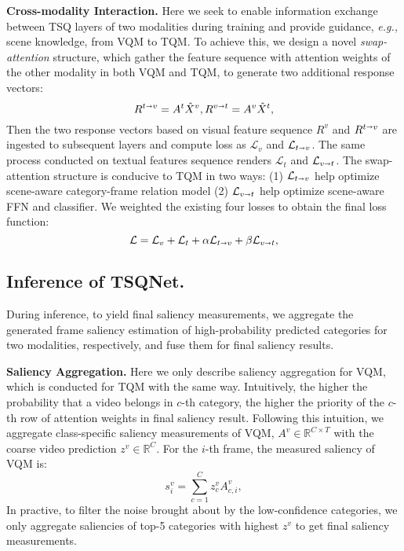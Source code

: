 \documentclass[runningheads]{llncs}
\begin{document}
\noindent\textbf{Cross-modality Interaction.}
Here we seek to enable information exchange between TSQ layers of two modalities during training and provide guidance, \emph{e.g.,} scene knowledge, from VQM to TQM. To achieve this, we design a novel \textit{swap-attention} structure, which gather the feature sequence with attention weights of the other modality in both VQM and TQM, to generate two additional response vectors: 
\begin{equation}
R^{t\shortrightarrow v}=A^t \hat{X}^v, R^{v\shortrightarrow t} = A^v \hat{X}^t ,   
\end{equation}
Then the two response vectors based on visual feature sequence $R^{v}$ and $R^{t\shortrightarrow v}$ are ingested to subsequent layers and compute loss as $\mathcal{L}_v$ and $\mathcal{L}_{t\shortrightarrow v}$. The same process conducted on textual features sequence renders $\mathcal{L}_t$ and $\mathcal{L}_{v\shortrightarrow t}$. 
The swap-attention structure is conducive to TQM in two ways: (1) $\mathcal{L}_{t\shortrightarrow v}$ help optimize scene-aware category-frame relation model (2) $\mathcal{L}_{v\shortrightarrow t}$ help optimize scene-aware FFN and classifier. 
We weighted the existing four losses to obtain the final loss function:
\begin{equation}
\mathcal L =  \mathcal L_{v} + \mathcal L_{t} + \alpha \mathcal L_{t\shortrightarrow v} + \beta \mathcal L_{v \shortrightarrow t} ,
\end{equation}\label{loss}


\subsection{Inference of TSQNet.}\label{inference}
During inference, to yield final saliency measurements, we  aggregate the generated frame saliency estimation of high-probability predicted categories for two modalities, respectively, and fuse them for final saliency results. 


\noindent \textbf{Saliency Aggregation.}
Here we only describe saliency aggregation for VQM, which is conducted for TQM with the same way. Intuitively, the higher the probability that a video belongs in $c$-th category, the higher the priority of the $c$-th row of attention weights in final saliency result. Following this intuition, we aggregate class-specific saliency measurements of VQM, $A^v \in \mathbb{R}^{C\times T}$ with the coarse video prediction $z^v \in \mathbb{R}^{C}$. For the $i$-th frame, the measured saliency of VQM is:
\begin{equation}
s^v_i = \sum_{c=1}^{C}z^v_c A^v_{c,i},
\end{equation}\label{reweight1}
In practive, to filter the noise brought about by the low-confidence categories, we only aggregate saliencies of top-5 categories with highest $z^v$ to get final saliency measurements.
\end{document}
